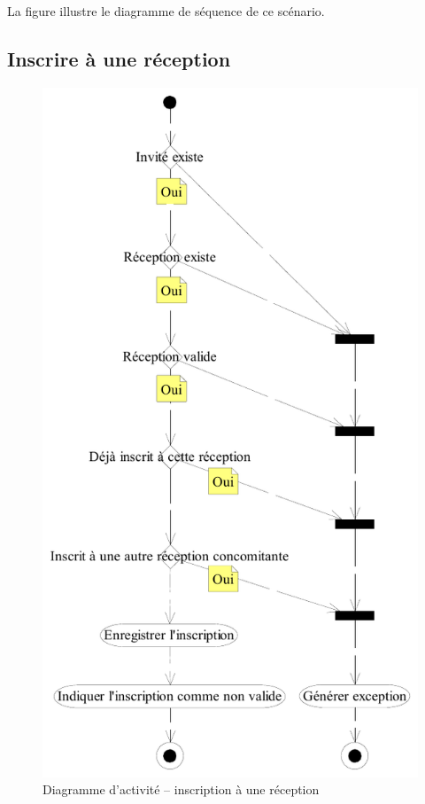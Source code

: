 La figure  illustre le diagramme de séquence de ce scénario.

\subsection{Inscrire à une réception}

\begin{figure}
  \centering
  \includegraphics[scale=.88]{IMG/da_inscription_reception}
  \caption{Diagramme d'activité -- inscription à une réception}
  \label{img_da_inscription_reception}
\end{figure}

